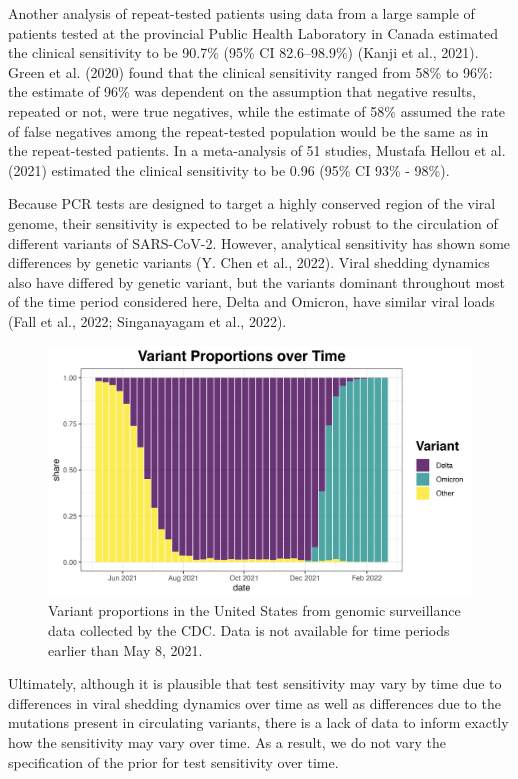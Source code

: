 \documentclass[12pt,twoside]{smiththesis}
\begin{document}
Another analysis of repeat-tested patients using data from a large sample of patients tested at the provincial Public Health Laboratory in Canada estimated the clinical sensitivity to be 90.7\% (95\% CI 82.6--98.9\%) (Kanji et al., 2021). Green et al. (2020) found that the clinical sensitivity ranged from 58\% to 96\%: the estimate of 96\% was dependent on the assumption that negative results, repeated or not, were true negatives, while the estimate of 58\% assumed the rate of false negatives among the repeat-tested population would be the same as in the repeat-tested patients. In a meta-analysis of 51 studies, Mustafa Hellou et al. (2021) estimated the clinical sensitivity to be 0.96 (95\% CI 93\% - 98\%).

Because PCR tests are designed to target a highly conserved region of the viral genome, their sensitivity is expected to be relatively robust to the circulation of different variants of SARS-CoV-2. However, analytical sensitivity has shown some differences by genetic variants (Y. Chen et al., 2022). Viral shedding dynamics also have differed by genetic variant, but the variants dominant throughout most of the time period considered here, Delta and Omicron, have similar viral loads (Fall et al., 2022; Singanayagam et al., 2022).
\begin{figure}

{\centering \includegraphics[width=0.8\linewidth]{./figure/variant_plot} 

}

\caption{Variant proportions in the United States from genomic surveillance data collected by the CDC. Data is not available for time periods earlier than May 8, 2021.}\label{fig:unnamed-chunk-50}
\end{figure}
Ultimately, although it is plausible that test sensitivity may vary by time due to differences in viral shedding dynamics over time as well as differences due to the mutations present in circulating variants, there is a lack of data to inform exactly how the sensitivity may vary over time. As a result, we do not vary the specification of the prior for test sensitivity over time.
\end{document}
